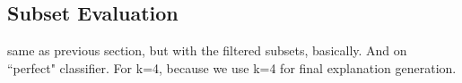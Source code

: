 {\subsection{Subset Evaluation}
same as previous section, but with the filtered subsets, basically. And on ``perfect" classifier. For k=4, because we use k=4 for final explanation generation.
}


